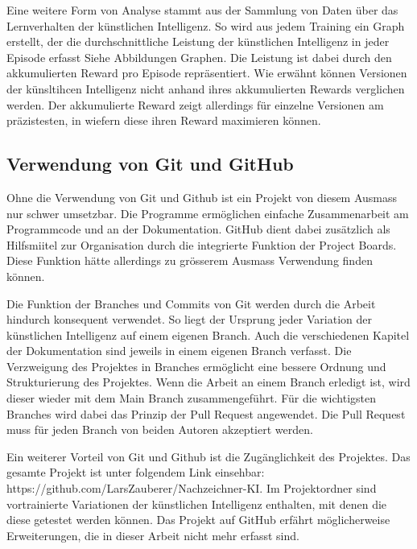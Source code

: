 Eine weitere Form von Analyse stammt aus der Sammlung von Daten über das
Lernverhalten der künstlichen Intelligenz. So wird aus jedem Training ein Graph
erstellt, der die durchschnittliche Leistung der künstlichen Intelligenz in
jeder Episode erfasst {Siehe Abbildungen Graphen}. Die Leistung ist dabei durch
den akkumulierten Reward pro Episode repräsentiert. Wie erwähnt können Versionen
der künsltihcen Intelligenz nicht anhand ihres akkumulierten Rewards verglichen
werden. Der akkumulierte Reward zeigt allerdings für einzelne Versionen am
präzistesten, in wiefern diese ihren Reward maximieren können.




\subsection{Verwendung von Git und GitHub}
Ohne die Verwendung von Git und Github ist ein Projekt von diesem Ausmass nur
schwer umsetzbar. Die Programme ermöglichen einfache Zusammenarbeit am
Programmcode und an der Dokumentation. GitHub dient dabei zusätzlich als
Hilfsmiitel zur Organisation durch die integrierte Funktion der Project Boards.
Diese Funktion hätte allerdings zu grösserem Ausmass Verwendung finden können.

Die Funktion der Branches und Commits von Git werden durch die Arbeit hindurch
konsequent verwendet. So liegt der Ursprung jeder Variation der künstlichen
Intelligenz auf einem eigenen Branch. Auch die verschiedenen Kapitel der
Dokumentation sind jeweils in einem eigenen Branch verfasst. Die Verzweigung des
Projektes in Branches ermöglicht eine bessere Ordnung und Strukturierung des
Projektes. Wenn die Arbeit an einem Branch erledigt ist, wird dieser wieder mit
dem Main Branch zusammengeführt. Für die wichtigsten Branches wird dabei das
Prinzip der Pull Request angewendet. Die Pull Request muss für jeden Branch von
beiden Autoren akzeptiert werden.

Ein weiterer Vorteil von Git und Github ist die Zugänglichkeit des Projektes.
Das gesamte Projekt ist unter folgendem Link einsehbar:
https://github.com/LarsZauberer/Nachzeichner-KI. Im Projektordner sind
vortrainierte Variationen der künstlichen Intelligenz enthalten, mit denen die
diese getestet werden können. Das Projekt auf GitHub erfährt möglicherweise
Erweiterungen, die in dieser Arbeit nicht mehr erfasst sind.






